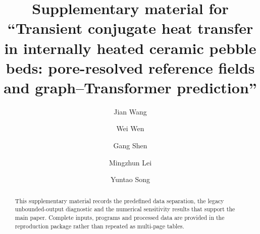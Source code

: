 \documentclass[preprint,12pt]{elsarticle}
\def\corref#1{}%
\begin{document}
\begin{frontmatter}

\title{Supplementary material for ``Transient conjugate heat transfer in internally heated ceramic pebble beds: pore-resolved reference fields and graph--Transformer prediction''}

\author[a,b]{Jian Wang\corref{cor1}}
\author[a,b]{Wei Wen}
\author[a]{Gang Shen}
\author[b]{Mingzhun Lei}
\author[b]{Yuntao Song}

\address[a]{Anhui University of Science and Technology, Huainan 232001, China}
\address[b]{Institute of Plasma Physics, Hefei Institutes of Physical Science, Chinese Academy of Sciences, Hefei 230031, China}

\begin{abstract}
This supplementary material records the predefined data separation, the
legacy unbounded-output diagnostic and the numerical sensitivity results that
support the main paper. Complete inputs, programs and processed data are
provided in the reproduction package rather than repeated as multi-page
tables.
\end{abstract}

\end{frontmatter}
\linenumbers


\end{document}
